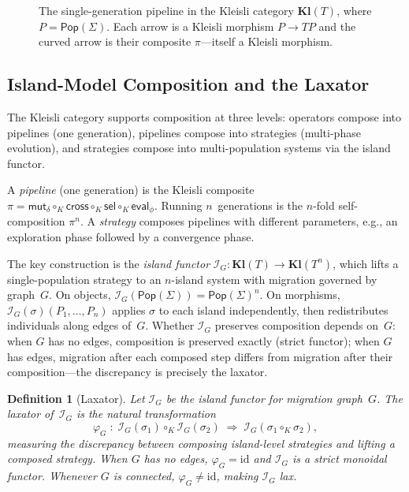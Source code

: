 \documentclass[submission,copyright,creativecommons]{eptcs}
\newtheorem{definition}{Definition}
\begin{document}
\begin{figure}[t]
\centering
{}
\caption{The single-generation pipeline in the Kleisli category
  $\mathbf{Kl}(T)$, where $P = \mathsf{Pop}(\Sigma)$.  Each arrow is a
  Kleisli morphism $P \to T\!P$ and the curved arrow is their composite
  $\pi$---itself a Kleisli morphism.}
\label{fig:kleisli-pipeline}
\end{figure}

\subsection{Island-Model Composition and the Laxator}
\label{sec:three-level}

The Kleisli category supports composition at three levels: operators
compose into pipelines (one generation), pipelines compose into
strategies (multi-phase evolution), and strategies compose into
multi-population systems via the island functor.

A \emph{pipeline} (one generation) is the Kleisli composite
$\pi = \mathsf{mut}_\delta \circ_K \mathsf{cross}
  \circ_K \mathsf{sel} \circ_K \mathsf{eval}_\phi$.
Running $n$~generations is the $n$-fold self-composition $\pi^n$.
A \emph{strategy} composes pipelines with different parameters,
e.g., an exploration phase followed by a convergence phase.

The key construction is the \emph{island functor}
$\mathcal{I}_G : \mathbf{Kl}(T) \to \mathbf{Kl}(T^n)$, which lifts
a single-population strategy to an $n$-island system with migration
governed by graph~$G$. On objects,
$\mathcal{I}_G(\mathsf{Pop}(\Sigma)) = \mathsf{Pop}(\Sigma)^n$. On
morphisms, $\mathcal{I}_G(\sigma)(P_1, \ldots, P_n)$ applies
$\sigma$ to each island independently, then redistributes
individuals along edges of~$G$. Whether $\mathcal{I}_G$ preserves
composition depends on~$G$: when $G$ has no edges, composition is
preserved exactly (strict functor); when $G$ has edges, migration
after each composed step differs from migration after their
composition---the discrepancy is precisely the laxator.

\begin{definition}[Laxator]
\label{def:laxator}
Let $\mathcal{I}_G$ be the island functor for migration graph~$G$.
The \emph{laxator} of~$\mathcal{I}_G$ is the natural transformation
\[
  \varphi_G \;:\; \mathcal{I}_G(\sigma_1) \circ_K \mathcal{I}_G(\sigma_2)
  \;\Rightarrow\; \mathcal{I}_G(\sigma_1 \circ_K \sigma_2),
\]
measuring the discrepancy between composing island-level strategies
and lifting a composed strategy. When $G$ has no edges,
$\varphi_G = \mathrm{id}$ and $\mathcal{I}_G$ is a strict monoidal
functor. Whenever $G$ is connected, $\varphi_G \neq \mathrm{id}$,
making $\mathcal{I}_G$ lax.
\end{definition}
\end{document}
